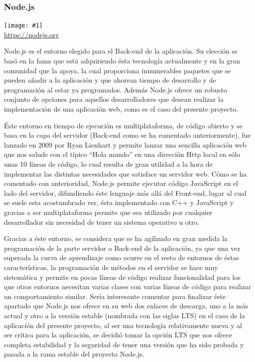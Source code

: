 \documentclass[11pt,openany]{book}
\newcommand{\logo}[2]{\medskip\begin{center}\texttt{[image: \#1]}\\\scriptsize\url{#2}\end{center}\bigskip}
\begin{document}
\subsubsection{Node.js}

\logo{logos/nodejs.png}{https://nodejs.org}

Node.js es el entorno elegido para el Back-end de la aplicación. Su elección se basó en la fama que está adquiriendo ésta tecnología actualmente y en la gran comunidad que la apoya, la cual proporciona innumerables paquetes que se pueden añadir a la aplicación y que ahorran tiempo de desarrollo y de programación al estar ya programados. Además Node.js ofrece un robusto conjunto de opciones para aquellos desarrolladores que desean realizar la implementación de una aplicación web, como es el caso del presente proyecto.

Éste entorno en tiempo de ejecución es multiplataforma, de código abierto y se basa en la capa del servidor (Back-end como se ha comentado anteriormente), fue lanzado en 2009 por Ryan Lienhart\cite{4} y permite lanzar una sencilla aplicación web que nos salude con el típico ``Hola mundo'' en una dirección Http local en sólo unas 10 líneas de código, lo cual resulta de gran utilidad a la hora de implementar las distintas necesidades que satisface un servidor web. Cómo se ha comentado con anterioridad, Node.js permite ejecutar código JavaScript en el lado del servidor, difundiendo éste lenguaje más allá del Front-end, lugar al cual se suele esta acostumbrado ver, ésta implementado con C++ y JavaScript y gracias a ser multiplataforma permite que sea utilizado por cualquier desarrollador sin necesidad de tener un sistema operativo u otro.

Gracias a éste entorno, se considera que se ha agilizado en gran medida la programación de la parte servidor o Back-end de la aplicación, ya que una vez superada la curva de aprendizaje como ocurre en el resto de entornos de éstas características, la programación de métodos en el servidor se hace muy sistemática y permite en pocas líneas de código realizar funcionalidad para los que otros entornos necesitan varias clases con varias líneas de código para realizar un comportamiento similar. Sería interesante comentar para finalizar éste apartado que Node.js nos ofrece en su web dos enlaces de descarga, uno a la más actual y otro a la versión estable (nombrada con las siglas LTS) en el caso de la aplicación del presente proyecto, al ser una tecnología relativamente nueva y al ser crítica para la aplicación, se decidió tomar la opción LTS que nos ofrece completa estabilidad y la seguridad de tener una versión que ha sido probada y pasada a la rama estable del proyecto Node.js.
\end{document}
